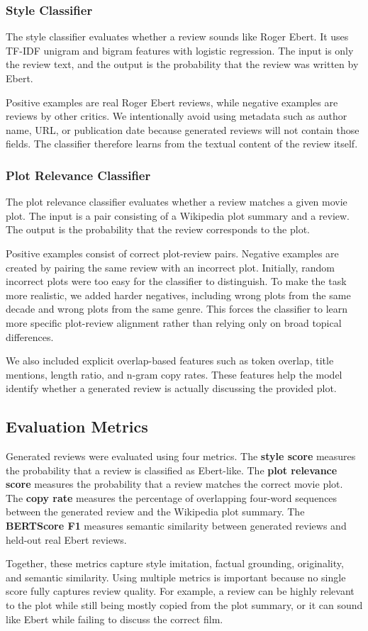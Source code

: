 \subsubsection{Style Classifier}

The style classifier evaluates whether a review sounds like Roger Ebert. It uses TF-IDF unigram and bigram features with logistic regression. The input is only the review text, and the output is the probability that the review was written by Ebert.

Positive examples are real Roger Ebert reviews, while negative examples are reviews by other critics. We intentionally avoid using metadata such as author name, URL, or publication date because generated reviews will not contain those fields. The classifier therefore learns from the textual content of the review itself.

\subsubsection{Plot Relevance Classifier}

The plot relevance classifier evaluates whether a review matches a given movie plot. The input is a pair consisting of a Wikipedia plot summary and a review. The output is the probability that the review corresponds to the plot.

Positive examples consist of correct plot-review pairs. Negative examples are created by pairing the same review with an incorrect plot. Initially, random incorrect plots were too easy for the classifier to distinguish. To make the task more realistic, we added harder negatives, including wrong plots from the same decade and wrong plots from the same genre. This forces the classifier to learn more specific plot-review alignment rather than relying only on broad topical differences.

We also included explicit overlap-based features such as token overlap, title mentions, length ratio, and n-gram copy rates. These features help the model identify whether a generated review is actually discussing the provided plot.

\subsection{Evaluation Metrics}

Generated reviews were evaluated using four metrics. The \textbf{style score} measures the probability that a review is classified as Ebert-like. The \textbf{plot relevance score} measures the probability that a review matches the correct movie plot. The \textbf{copy rate} measures the percentage of overlapping four-word sequences between the generated review and the Wikipedia plot summary. The \textbf{BERTScore F1} measures semantic similarity between generated reviews and held-out real Ebert reviews.

Together, these metrics capture style imitation, factual grounding, originality, and semantic similarity. Using multiple metrics is important because no single score fully captures review quality. For example, a review can be highly relevant to the plot while still being mostly copied from the plot summary, or it can sound like Ebert while failing to discuss the correct film.
